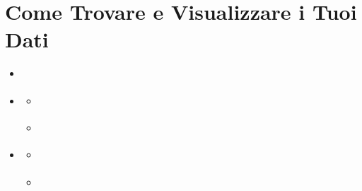 \documentclass[letterpaper,10pt,english]{sphinxmanual}
\begin{document}
\section{Come Trovare e Visualizzare i Tuoi Dati}
\label{\detokenize{it/02_trovare_visualizzare:come-trovare-e-visualizzare-i-tuoi-dati}}\label{\detokenize{it/02_trovare_visualizzare:find-it}}\label{\detokenize{it/02_trovare_visualizzare::doc}}
\begin{sphinxcontents}
\begin{itemize}
\item {} 
\sphinxAtStartPar
{}\label{\detokenize{it/02_trovare_visualizzare:id1}}{\hyperref[\detokenize{it/02_trovare_visualizzare:accedere-al-catalogo}]{}}

\item {} 
\sphinxAtStartPar
{}\label{\detokenize{it/02_trovare_visualizzare:id2}}{\hyperref[\detokenize{it/02_trovare_visualizzare:filtrare-e-cercare-nel-catalogo}]{}}
\begin{itemize}
\item {} 
\sphinxAtStartPar
{}\label{\detokenize{it/02_trovare_visualizzare:id3}}{\hyperref[\detokenize{it/02_trovare_visualizzare:usare-la-barra-di-ricerca}]{}}

\item {} 
\sphinxAtStartPar
{}\label{\detokenize{it/02_trovare_visualizzare:id4}}{\hyperref[\detokenize{it/02_trovare_visualizzare:usare-i-filtri}]{}}

\end{itemize}

\item {} 
\sphinxAtStartPar
{}\label{\detokenize{it/02_trovare_visualizzare:id5}}{\hyperref[\detokenize{it/02_trovare_visualizzare:esempio-guidato-trovare-un-dataset-pelagos}]{}}
\begin{itemize}
\item {} 
\sphinxAtStartPar
{}\label{\detokenize{it/02_trovare_visualizzare:id6}}{\hyperref[\detokenize{it/02_trovare_visualizzare:passo-1-aprire-il-catalogo}]{}}

\item {} 
\sphinxAtStartPar
{}\label{\detokenize{it/02_trovare_visualizzare:id7}}{\hyperref[\detokenize{it/02_trovare_visualizzare:passo-2-cercare-per-parola-chiave}]{}}


\end{itemize}
\end{itemize}
\end{sphinxcontents}
\end{document}
